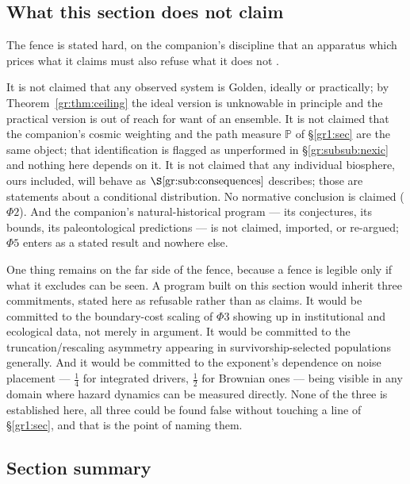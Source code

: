 \documentclass[11pt]{article}
\numberwithin{equation}{section}
\theoremstyle{plain}
\theoremstyle{definition}
\theoremstyle{remark}
\newcommand{\PP}{\mathbb{P}}
\begin{document}
\subsection{What this section does not claim}\label{gr:sub:fence}

The fence is stated hard, on the companion's discipline that an
apparatus which prices what it claims must also refuse what it does not
\cite{Ben26Optimal}.

It is not claimed that any observed system is Golden, ideally or
practically; by Theorem~\ref{gr:thm:ceiling} the ideal version is
unknowable in principle and the practical version is out of reach for
want of an ensemble. It is not claimed that the companion's cosmic
weighting and the path measure $\PP$ of
\S\ref{gr1:sec} are the same object; that
identification is flagged as unperformed in
\S\ref{gr:subsub:nexic} and nothing here depends on it. It is not
claimed that any individual biosphere, ours included, will behave as
$\S\ref{gr:sub:consequences}$ describes; those are statements about a
conditional distribution. No normative conclusion is claimed
($\Phi2$). And the companion's natural-historical program --- its
conjectures, its bounds, its paleontological predictions --- is not
claimed, imported, or re-argued; $\Phi5$ enters as a stated result and
nowhere else.

One thing remains on the far side of the fence, because a fence is
legible only if what it excludes can be seen. A program built on this
section would inherit three commitments, stated here as refusable rather
than as claims. It would be committed to the boundary-cost scaling of
$\Phi3$ showing up in institutional and ecological data, not merely in
argument. It would be committed to the truncation/rescaling asymmetry
appearing in survivorship-selected populations generally. And it would
be committed to the exponent's dependence on noise placement --- $\tfrac14$
for integrated drivers, $\tfrac12$ for Brownian ones --- being visible
in any domain where hazard dynamics can be measured directly. None of
the three is established here, all three could be found false without
touching a line of \S\ref{gr1:sec}, and that is the
point of naming them.

\subsection*{Section summary}
\end{document}
